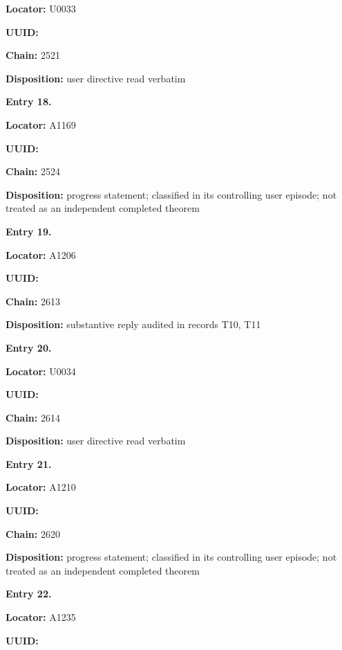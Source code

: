 \textbf{Locator:} U0033

\textbf{UUID:} \protect{}

\textbf{Chain:} 2521

\textbf{Disposition:} user directive read verbatim


\textbf{Entry 18.}

\textbf{Locator:} A1169

\textbf{UUID:} \protect{}

\textbf{Chain:} 2524

\textbf{Disposition:} progress statement; classified in its controlling
user episode; not treated as an independent completed theorem


\textbf{Entry 19.}

\textbf{Locator:} A1206

\textbf{UUID:} \protect{}

\textbf{Chain:} 2613

\textbf{Disposition:} substantive reply audited in records T10, T11


\textbf{Entry 20.}

\textbf{Locator:} U0034

\textbf{UUID:} \protect{}

\textbf{Chain:} 2614

\textbf{Disposition:} user directive read verbatim


\textbf{Entry 21.}

\textbf{Locator:} A1210

\textbf{UUID:} \protect{}

\textbf{Chain:} 2620

\textbf{Disposition:} progress statement; classified in its controlling
user episode; not treated as an independent completed theorem


\textbf{Entry 22.}

\textbf{Locator:} A1235

\textbf{UUID:} \protect{}

